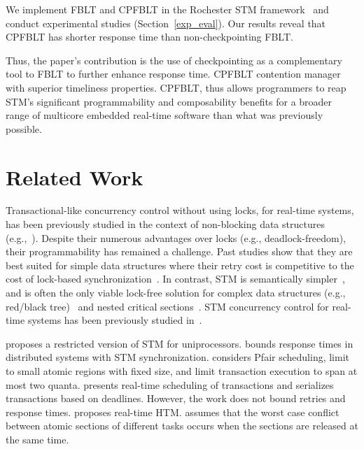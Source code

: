 \documentclass[preprint]{sigplanconf}
\begin{document}
We implement FBLT and CPFBLT in the Rochester STM framework~\cite{marathe2006lowering} and conduct experimental studies (Section~\ref{exp_eval}). Our results reveal that CPFBLT has shorter response time than non-checkpointing FBLT.

Thus, the paper's contribution is the use of checkpointing as a complementary tool to FBLT to further enhance response time. CPFBLT contention manager with superior timeliness properties. CPFBLT, thus allows programmers to reap STM's significant programmability and composability benefits for a broader range of multicore embedded real-time software than what was previously possible.

\section{Related Work}
\label{sec:past}

Transactional-like concurrency control without using locks, for real-time systems, has been previously studied in the context of non-blocking data structures (e.g.,~\cite{anderson95realtime}). Despite their numerous advantages over locks 
(e.g., deadlock-freedom), their programmability has remained a challenge. Past studies show that they are best suited for simple data structures where their retry cost is competitive to the cost of lock-based synchronization~\cite{bc+08}.  In contrast, STM is semantically simpler~\cite{Herlihy:2006:AMP:1146381.1146382}, and is often the only viable lock-free solution for complex data structures (e.g., red/black tree)~\cite{key-1} and nested critical sections~\cite{Saha:2006:MHP:1122971.1123001}. STM concurrency control for real-time systems has been previously studied in~\cite{manson2006preemptible,fahmy2009bounding,sarni2009real,schoeberl2010rttm,key-1,barrosmanaging,stmconcurrencycontrol:emsoft11,lcmdac2012,pnf_dac_asp,fblt}.

\cite{manson2006preemptible} proposes a restricted version of STM for uniprocessors. \cite{fahmy2009bounding} bounds response times in distributed  systems with STM synchronization. \cite{fahmy2009bounding} considers Pfair scheduling, limit to small atomic regions with fixed size, and limit transaction execution to span at most two quanta. \cite{sarni2009real} presents real-time scheduling of transactions and serializes transactions based on deadlines. However, the work does not bound retries and response times. \cite{schoeberl2010rttm} proposes real-time HTM. \cite{schoeberl2010rttm} assumes that the worst case conflict between atomic sections of different tasks occurs when the sections are released at the same time. 
\end{document}

